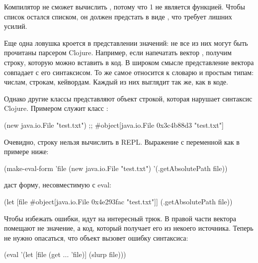 Компилятор не сможет вычислить , потому что 1 не является функцией. Чтобы список остался списком, он должен предстать в виде , что требует лишних усилий.

Еще одна ловушка кроется в представлении значений: не все из них могут быть прочитаны парсером Clojure. Например, если напечатать вектор \code{[1 2 3]}, получим строку, которую можно вставить в код. В широком смысле представление вектора совпадает с его синтаксисом. То же самое относится к словарю и простым типам: числам, строкам, кейвордам. Каждый из них выглядит так же, как в коде.

Однако другие классы представляют объект строкой, которая нарушает синтаксис Clojure. Примером служит класс :

\begin{english}
  \begin{clojure}
(new java.io.File "test.txt")
;; #object[java.io.File 0x3c4b88d3 "test.txt"]
  \end{clojure}
\end{english}

Очевидно, строку  нельзя вычислить в REPL. Выражение с переменной  как в примере ниже:

\begin{english}
  \begin{clojure}
(make-eval-form
 {'file (new java.io.File "test.txt")}
 '(.getAbsolutePath file))
  \end{clojure}
\end{english}

даст форму, несовместимую с eval:

\begin{english}
  \begin{clojure}
(let [file #object[java.io.File 0x4e293fac "test.txt"]]
  (.getAbsolutePath file))
  \end{clojure}
\end{english}

Чтобы избежать ошибки, идут на интересный трюк. В правой части вектора  помещают не значение, а код, который получает его из некоего источника. Теперь не нужно опасаться, что объект  вызовет ошибку синтаксиса:

\begin{english}
  \begin{clojure}
(eval '(let [file (get ... 'file)]
         (slurp file)))
  \end{clojure}
\end{english}

